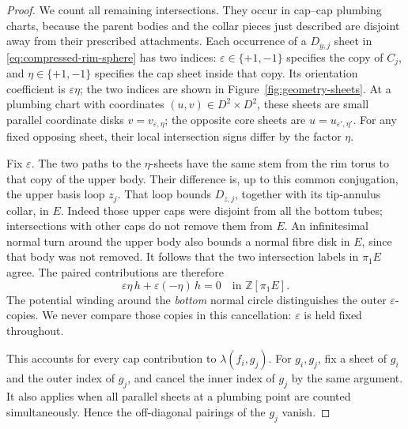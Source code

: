 \begin{proof}
We count all remaining intersections. They occur in cap--cap plumbing
charts, because the parent bodies and the collar pieces just described
are disjoint away from their prescribed attachments. Each occurrence of
a \(D_{y,j}\) sheet in \eqref{eq:compressed-rim-sphere} has two indices:
\(\varepsilon\in\{+1,-1\}\) specifies the copy of \(C_j\), and
\(\eta\in\{+1,-1\}\) specifies the cap sheet inside that copy.
Its orientation coefficient is \(\varepsilon\eta\); the two indices are
shown in Figure~\ref{fig:geometry-sheets}.
At a plumbing chart with coordinates \((u,v)\in D^2\times D^2\), these
sheets are small parallel coordinate disks \(v=v_{\varepsilon,\eta}\);
the opposite core sheets are \(u=u_{\varepsilon',\eta'}\).
For any fixed opposing sheet, their local intersection signs differ by
the factor \(\eta\).

Fix \(\varepsilon\). The two paths to the \(\eta\)-sheets have the same
stem from the rim torus to that copy of the upper body. Their difference
is, up to this common conjugation, the upper basis loop \(z_j\).
That loop bounds \(D_{z,j}\), together with its tip-annulus collar, in
\(E\). Indeed those upper caps were disjoint from all the bottom tubes;
intersections with other caps do not remove them from \(E\).
An infinitesimal normal turn around the upper body also bounds a normal
fibre disk in \(E\), since that body was not removed.
It follows that the two intersection labels in \(\pi_1E\) agree.
The paired contributions are therefore
\[
 \varepsilon\eta\, h+\varepsilon(-\eta)\,h=0
 \quad\text{in }\mathbb Z[\pi_1E].
\]
The potential winding around the \emph{bottom} normal circle distinguishes
the outer \(\varepsilon\)-copies. We never compare those copies in this
cancellation: \(\varepsilon\) is held fixed throughout.



This accounts for every cap contribution to \(\lambda(f_i,g_j)\).
For \(g_i,g_j\), fix a sheet of \(g_i\) and the outer index of \(g_j\),
and cancel the inner index of \(g_j\) by the same argument. It also
applies when all parallel sheets at a plumbing point are counted
simultaneously. Hence the off-diagonal pairings of the \(g_j\) vanish.


\end{proof}
